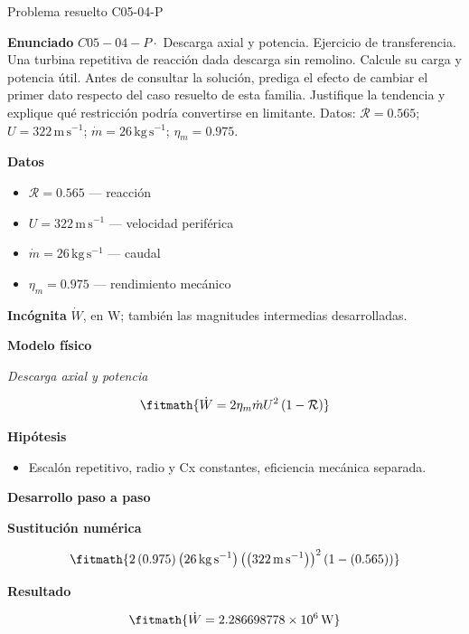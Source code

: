 \documentclass[10pt,openany]{book}
\begin{document}
\begin{studiumworked}{Problema resuelto C05-04-P}


\noindent\textbf{Enunciado}
\(C05-04-P \cdot\) Descarga axial y potencia. Ejercicio de transferencia. Una turbina repetitiva de reacción dada descarga sin remolino. Calcule su carga y potencia útil. Antes de consultar la solución, prediga el efecto de cambiar el primer dato respecto del caso resuelto de esta familia. Justifique la tendencia y explique qué restricción podría convertirse en limitante. Datos: \(\mathcal R=0.565\); \(U=322\, \mathrm{m}\,\mathrm{s}^{-1}\); \(\dot m=26\, \mathrm{kg}\,\mathrm{s}^{-1}\); \(\eta_m=0.975\).

\noindent\textbf{Datos}
\begin{itemize}
\item $\mathcal R = 0.565$ — reacción
\item $U = 322\,\mathrm{m}\,\mathrm{s}^{-1}$ — velocidad periférica
\item $\dot m = 26\,\mathrm{kg}\,\mathrm{s}^{-1}$ — caudal
\item $\eta_m = 0.975$ — rendimiento mecánico
\end{itemize}

\noindent\textbf{Incógnita}
$\dot{W}$, en $\mathrm{W}$; también las magnitudes intermedias desarrolladas.

\noindent\textbf{Modelo físico}

\noindent\textit{Descarga axial y potencia}

\[
\fitmath{\dot{W}=2 \eta_m \dot m U^{2} \left(1 - \mathcal R\right)}
\]

\noindent\textbf{Hipótesis}
\begin{itemize}
\item Escalón repetitivo, radio y Cx constantes, eficiencia mecánica separada.
\end{itemize}

\noindent\textbf{Desarrollo paso a paso}



\noindent\textbf{Sustitución numérica}

\[
\fitmath{2 \left(0.975\right) \left(26\,\mathrm{kg}\,\mathrm{s}^{-1}\right) \left(\left(322\,\mathrm{m}\,\mathrm{s}^{-1}\right)\right)^{2} \left(1 - \left(0.565\right)\right)}
\]

\noindent\textbf{Resultado}

\[
\fitmath{\dot{W}=2.286698778\times10^{6}\,\mathrm{W}}
\]


\end{studiumworked}
\end{document}
